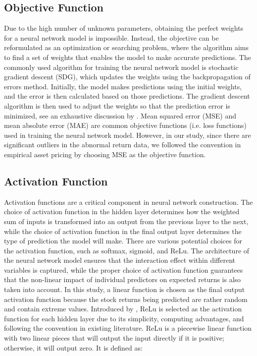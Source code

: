 \subsection{Objective Function}

Due to the high number of unknown parameters, obtaining the perfect weights for a neural network model is impossible. Instead, the objective can be reformulated as an optimization or searching problem, where the algorithm aims to find a set of weights that enables the model to make accurate predictions. The commonly used algorithm for training the neural network model is stochastic gradient descent (SDG), which updates the weights using the backpropagation of errors method. Initially, the model makes predictions using the initial weights, and the error is then calculated based on those predictions. The gradient descent algorithm is then used to adjust the weights so that the prediction error is minimized, see an exhaustive discussion by \citet*{domingos2012few}. Mean squared error (MSE) and mean absolute error (MAE) are common objective functions (i.e. loss functions) used in training the neural network model. However, in our study, since there are significant outliers in the abnormal return data, we followed the convention in empirical asset pricing by choosing MSE as the objective function.

\subsection{Activation Function}

Activation functions are a critical component in neural network construction. The choice of activation function in the hidden layer determines how the weighted sum of inputs is transformed into an output from the previous layer to the next, while the choice of activation function in the final output layer determines the type of prediction the model will make. There are various potential choices for the activation function, such as softmax, sigmoid, and ReLu. The architecture of the neural network model ensures that the interaction effect within different variables is captured, while the proper choice of activation function guarantees that the non-linear impact of individual predictors on expected returns is also taken into account. In this study, a linear function is chosen as the final output activation function because the stock returns being predicted are rather random and contain extreme values. Introduced by \citet*{nair2010rectified}, ReLu is selected as the activation function for each hidden layer due to its simplicity, computing advantages, and following the convention in existing literature. ReLu is a piecewise linear function with two linear pieces that will output the input directly if it is positive; otherwise, it will output zero. It is defined as:


